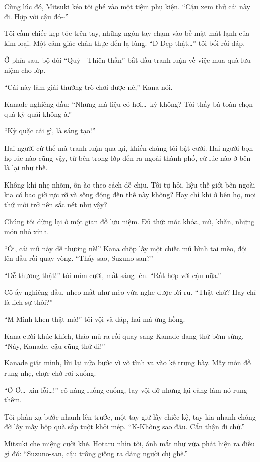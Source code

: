 \documentclass[../main.tex]{subfiles}
\begin{document}
Cùng lúc đó, Mitsuki kéo tôi ghé vào một tiệm phụ kiện. ``Cậu xem thử cái này đi. Hợp với cậu đó\~{}''

Tôi cầm chiếc kẹp tóc trên tay, những ngón tay chạm vào bề mặt mát lạnh của kim loại. Một cảm giác chân thực đến lạ lùng. ``Đ-Đẹp thật\dots'' tôi bối rối đáp.

Ở phía sau, bộ đôi ``Quỷ - Thiên thần'' bắt đầu tranh luận về việc mua quà lưu niệm cho lớp.

``Cái này làm giải thưởng trò chơi được nè,'' Kana nói.

Kanade nghiêng đầu: ``Nhưng mà liệu có hơi\dots\ kỳ không? Tôi thấy bà toàn chọn quà kỳ quái không à.''

``Kỳ quặc cái gì, là sáng tạo!''

Hai người cứ thế mà tranh luận qua lại, khiến chúng tôi bật cười. Hai người bọn họ lúc nào cũng vậy, từ bên trong lớp đến ra ngoài thành phố, cứ lúc nào ở bên là lại như thế.

Không khí nhẹ nhõm, ồn ào theo cách dễ chịu. Tôi tự hỏi, liệu thế giới bên ngoài kia có bao giờ rực rỡ và sống động đến thế này không? Hay chỉ khi ở bên họ, mọi thứ mới trở nên sắc nét như vậy?

\ct

Chúng tôi dừng lại ở một gian đồ lưu niệm. Đủ thứ: móc khóa, mũ, khăn, những món nhỏ xinh.

``Ôi, cái mũ này dễ thương nè!'' Kana chộp lấy một chiếc mũ hình tai mèo, đội lên đầu rồi quay vòng. ``Thấy sao, Suzuno-san?''

``Dễ thương thật!'' tôi mỉm cười, mắt sáng lên. ``Rất hợp với cậu nữa.''

Cô ấy nghiêng đầu, nheo mắt như mèo vừa nghe được lời ru. ``Thật chứ? Hay chỉ là lịch sự thôi?''

``M-Mình khen thật mà!'' tôi vội vã đáp, hai má ửng hồng.

Kana cười khúc khích, tháo mũ ra rồi quay sang Kanade đang thử bờm sừng. ``Này, Kanade, cậu cũng thử đi!''

Kanade giật mình, lùi lại nửa bước vì vô tình va vào kệ trưng bày. Mấy món đồ rung nhẹ, chực chờ rơi xuống.

``Ơ-Ơ\dots\ xin lỗi\dots!'' cô nàng luống cuống, tay vội đỡ nhưng lại càng làm nó rung thêm.

Tôi phản xạ bước nhanh lên trước, một tay giữ lấy chiếc kệ, tay kia nhanh chóng đỡ lấy mấy hộp quà sắp tuột khỏi mép. ``K-Không sao đâu. Cẩn thận đi chứ.''

Mitsuki che miệng cười khẽ. Hotaru nhìn tôi, ánh mắt như vừa phát hiện ra điều gì đó: ``Suzuno-san, cậu trông giống ra dáng người chị ghê.''
\end{document}
